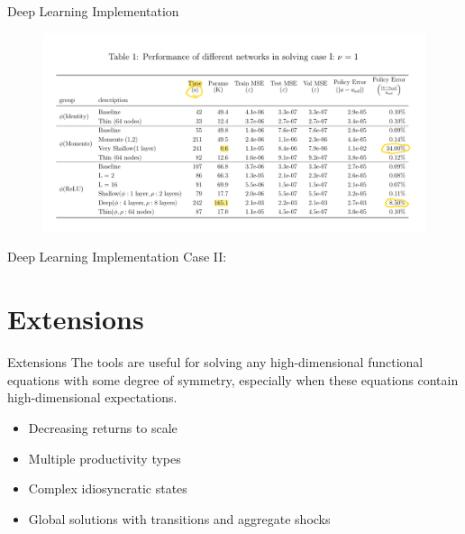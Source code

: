 \documentclass[dvipsnames,mathserif]{beamer}
\begin{document}
{\begin{frame}{Deep Learning Implementation}
\begin{figure}[h!]
\centering
\includegraphics[width = \textwidth]{6.png}
\end{figure}
\end{frame}

\begin{frame}{Deep Learning Implementation}
Case II: 
\end{frame}

\section{Extensions}
\begin{frame}{Extensions}
The tools are useful for solving any high-dimensional functional equations with some degree of symmetry, especially when these equations contain high-dimensional expectations.
    \begin{itemize}
        \item Decreasing returns to scale\\
        \vspace{0.2cm}
        \item Multiple productivity types\\
        \vspace{0.2cm}
        \item Complex idiosyncratic states\\
        \vspace{0.2cm}
        \item Global solutions with transitions and aggregate shocks

    \end{itemize}
\end{frame}

}
\end{document}
